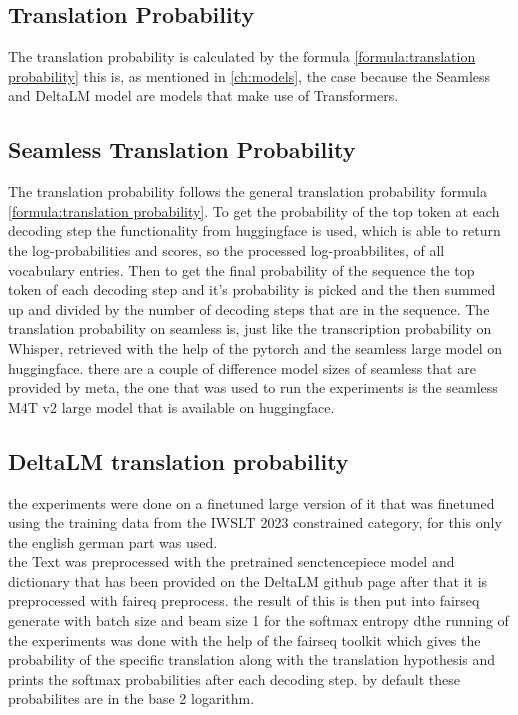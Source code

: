 \subsection{Translation Probability}
The translation probability is calculated by the formula \ref{formula:translation probability} this is, as mentioned in \ref{ch:models}, the case because the Seamless and DeltaLM model are models that make use of Transformers. 

\subsection{Seamless Translation Probability}
The translation probability follows the general translation probability formula \ref{formula:translation probability}. To get the probability of the top token at each decoding step the functionality from huggingface is used, which is able to return the log-probabilities and scores, so the processed log-proabbilites, of all vocabulary entries. 
Then to get the final probability of the sequence the top token of each decoding step and it's probability is picked and the then summed up and divided by the number of decoding steps that are in the sequence.
The translation probability on seamless is, just like the transcription probability on Whisper, retrieved with the help of the pytorch and the seamless large model on huggingface. 
there are a couple of difference model sizes of seamless that are provided by meta, the one that was used to run the experiments is the seamless M4T v2 large model that is available on huggingface. 

\subsection{DeltaLM translation probability}
the experiments \cite{ma2021deltalm} were done on a finetuned large version of it that was finetuned using the training data from the IWSLT 2023 constrained category, for this only the english german part was used.
\\
the Text was preprocessed with the pretrained senctencepiece model and dictionary that has been provided on the DeltaLM github page \cite{deltalmurl} after that it is preprocessed with faireq preprocess. the result of this is then put into fairseq generate with batch size and beam size 1 for the softmax entropy 
 dthe running of the experiments was done with the help of the fairseq toolkit \cite{ott2019fairseqfastextensibletoolkit} which gives the probability of the specific translation along with the translation hypothesis and prints the softmax probabilities after each decoding step. by default these probabilites are in the base 2 logarithm. 

